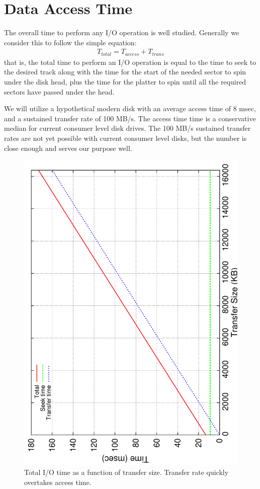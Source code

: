 \section{Data Access Time}\label{sec:basics}

The overall time to perform any I/O operation is well studied.
Generally we consider this to follow the simple equation:
\begin{align*}
  T_{total} = T_{access} + T_{trans}
\end{align*}
that is, the total time to perform an I/O operation is equal to the
time to seek to the desired track along with the time for the start of
the needed sector to spin under the disk head, plus the time for the
platter to spin until all the required sectors have passed under the
head.

We will utilize a hypothetical modern disk with an average access
time of 8 msec, and a sustained transfer rate of 100 MB/s. The access
time time is a conservative median for current consumer level disk
drives. The 100 MB/s sustained transfer rates are not yet possible with
current consumer level disks, but the number is close enough and serves
our purpose well.

\begin{figure}
  \includegraphics[angle=270,width=\linewidth]{images/io/io-overall}
  \caption{Total I/O time as a function of transfer size.  Transfer rate
  quickly overtakes access time.}
  \label{fig:io-total}
\end{figure}

